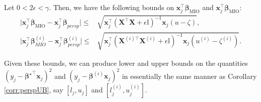 \documentclass[opre,nonblindrev]{informs3} %
\begin{document}
\begin{corollary}\label{corr:confidenceadjustment}
    Let $0 < 2\epsilon < \gamma$. Then, we have the following bounds on $\bm{x}_j^\top \bm{\beta}_{\text{MIO}}$ and $\bm{x}_j^\top \bm{\beta}_{\text{MIO}}$:
    \begin{align}
       \vert \bm{x}_j^\top \bm{\beta}_{\text{MIO}} - \bm{x}_j^\top \bm{\beta}_{persp}\vert \leq & \sqrt{\bm{x}_j^\top \left(\bm{X}^\top \bm{X}+\epsilon\mathbb{I}\right)^{-1} \bm{x}_j(u-\zeta)},\\
        \vert \bm{x}_j^\top \bm{\beta}^{(i)}_{MIO} -\bm{x}_j^\top \bm{\beta}^{(i)}_{persp}\vert \leq & \sqrt{\bm{x}_j^\top \left(\bm{X}^{(i)\top} \bm{X}^{(i)}+\epsilon\mathbb{I}\right)^{-1} \bm{x}_j(u^{(i)}-\zeta^{(i)})}.
    \end{align}
\end{corollary}
Given these bounds, we can produce lower and upper bounds on the quantities $(y_j-{\bm{\beta}^\star}^\top \bm{x}_j)^2$ and $(y_j-\bm{\beta}^{(i)} \bm{x}_j)^2$ in essentially the same manner as Corollary \ref{corr:perspUB}, say $[l_j, u_j]$ and $[l^{(i)}_j, u_j^{(i)}]$. 
\end{document}
